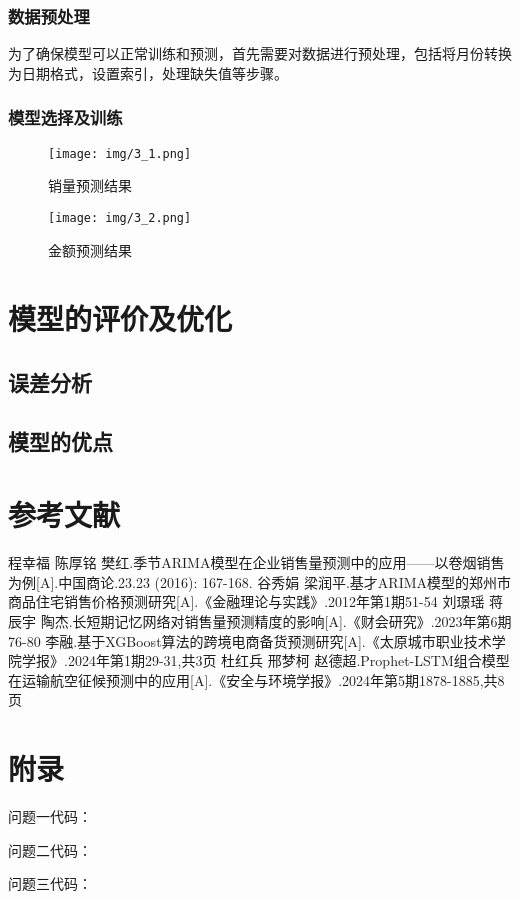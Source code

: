 \documentclass[a4paper]{article}
\begin{document}
	\subsubsection{数据预处理}
	为了确保模型可以正常训练和预测，首先需要对数据进行预处理，包括将月份转换为日期格式，设置索引，处理缺失值等步骤。

	\subsubsection{模型选择及训练}



	\begin{figure}[H]
		\centering
		\texttt{[image: img/3\_1.png]}
		\caption{销量预测结果}
	\end{figure}
	\begin{figure}[H]
		\centering
		\texttt{[image: img/3\_2.png]}
		\caption{金额预测结果}
	\end{figure}


	
	\section{模型的评价及优化}
	\subsection{误差分析}
	\subsection{模型的优点}
	\newpage
	\pagestyle{plain}
	\section{参考文献}
	\begin{thebibliography}{9}
		程幸福 \hspace{2pt}陈厚铭 \hspace{2pt}樊红.季节ARIMA模型在企业销售量预测中的应用——以卷烟销售为例[A].中国商论.23.23 (2016): 167-168.
		谷秀娟 \hspace{2pt}梁润平.基才ARIMA模型的郑州市商品住宅销售价格预测研究[A].《金融理论与实践》.2012年第1期51-54
		刘璟瑶 \hspace{2pt}蒋辰宇 \hspace{2pt}陶杰.长短期记忆网络对销售量预测精度的影响[A].《财会研究》.2023年第6期76-80
		李融.基于XGBoost算法的跨境电商备货预测研究[A].《太原城市职业技术学院学报》.2024年第1期29-31,共3页
		杜红兵 \hspace{2pt}邢梦柯 \hspace{2pt}赵德超.Prophet-LSTM组合模型在运输航空征候预测中的应用[A].《安全与环境学报》.2024年第5期1878-1885,共8页
	\end{thebibliography}
	\newpage %

	\section{附录}
	问题一代码：

	问题二代码：

	问题三代码：	
	
	
\end{document}
